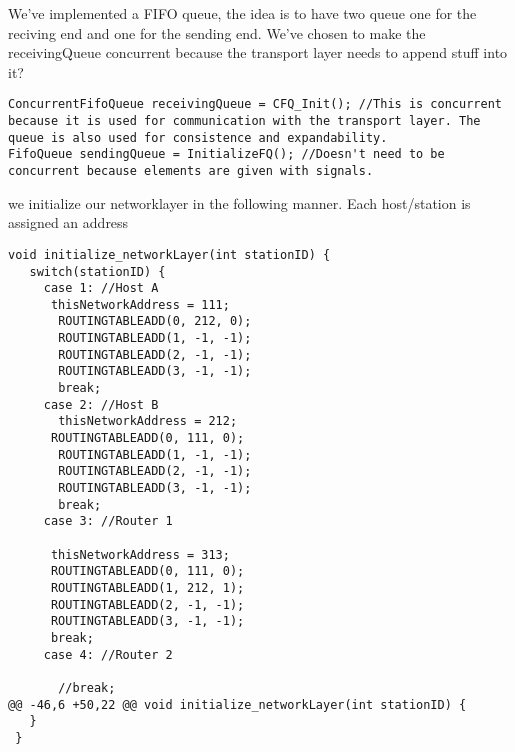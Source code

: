We've implemented a FIFO queue, the idea is to have two queue one for the reciving end and one for the sending end. We've chosen to make the receivingQueue concurrent because the transport layer needs to append stuff into it?

\begin{lstlisting}
ConcurrentFifoQueue receivingQueue = CFQ_Init(); //This is concurrent because it is used for communication with the transport layer. The queue is also used for consistence and expandability.
FifoQueue sendingQueue = InitializeFQ(); //Doesn't need to be concurrent because elements are given with signals.
\end{lstlisting}



we initialize our networklayer in the following manner.
Each host/station is assigned an address

\begin{lstlisting}
void initialize_networkLayer(int stationID) {
   switch(stationID) {
     case 1: //Host A
      thisNetworkAddress = 111;
       ROUTINGTABLEADD(0, 212, 0);
       ROUTINGTABLEADD(1, -1, -1);
       ROUTINGTABLEADD(2, -1, -1);
       ROUTINGTABLEADD(3, -1, -1);
       break;
     case 2: //Host B
       thisNetworkAddress = 212;
      ROUTINGTABLEADD(0, 111, 0);
       ROUTINGTABLEADD(1, -1, -1);
       ROUTINGTABLEADD(2, -1, -1);
       ROUTINGTABLEADD(3, -1, -1);
       break;
     case 3: //Router 1

      thisNetworkAddress = 313;
      ROUTINGTABLEADD(0, 111, 0);
      ROUTINGTABLEADD(1, 212, 1);
      ROUTINGTABLEADD(2, -1, -1);
      ROUTINGTABLEADD(3, -1, -1);
      break;
     case 4: //Router 2

       //break;
@@ -46,6 +50,22 @@ void initialize_networkLayer(int stationID) {
   }
 }
\end{lstlisting}



\hfill \break
